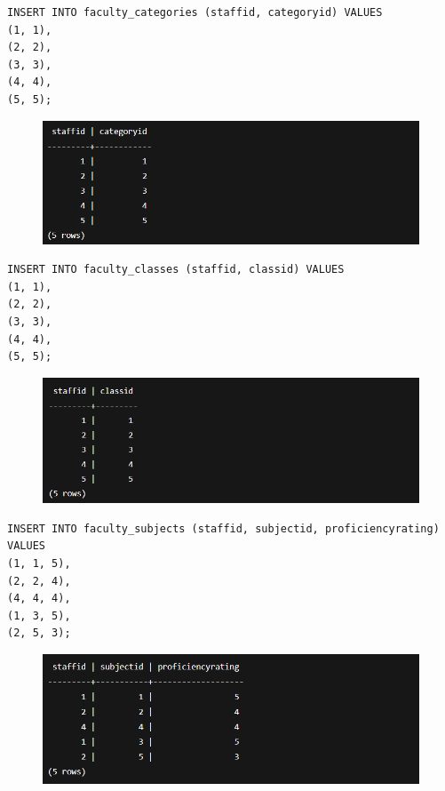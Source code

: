 \documentclass{article}
\begin{document}
\begin{Verbatim}[frame=single,framerule=1pt,fontfamily=courier,fontsize=\small]
INSERT INTO faculty_categories (staffid, categoryid) VALUES 
(1, 1),
(2, 2),
(3, 3),
(4, 4),
(5, 5);
\end{Verbatim}
\begin{figure}[H]
    \centering
    \includegraphics[width=\textwidth]{select/faculty_categories.png}
\end{figure}

\begin{Verbatim}[frame=single,framerule=1pt,fontfamily=courier,fontsize=\small]
INSERT INTO faculty_classes (staffid, classid) VALUES 
(1, 1),
(2, 2),
(3, 3),
(4, 4),
(5, 5);
\end{Verbatim}
\begin{figure}[H]
    \centering
    \includegraphics[width=\textwidth]{select/faculty_classes.png}
\end{figure}

\begin{Verbatim}[frame=single,framerule=1pt,fontfamily=courier,fontsize=\small]
INSERT INTO faculty_subjects (staffid, subjectid, proficiencyrating) VALUES 
(1, 1, 5),
(2, 2, 4),
(4, 4, 4),
(1, 3, 5),
(2, 5, 3);
\end{Verbatim}
\begin{figure}[H]
    \centering
    \includegraphics[width=\textwidth]{select/faculty_subjects.png}
\end{figure}
\end{document}
